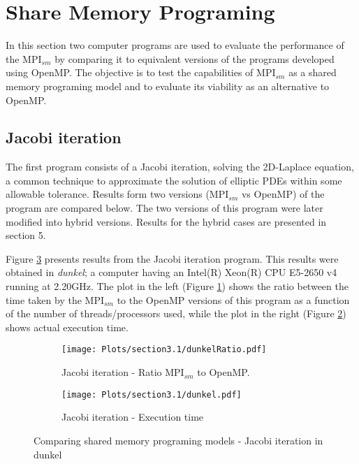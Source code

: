 \section{Share Memory Programing}

In this section two computer programs are used to evaluate the performance of the MPI$_{sm}$ by comparing it to equivalent versions of the programs developed using OpenMP. The objective is to test the capabilities of MPI$_{sm}$ as a shared memory programing model and to evaluate its viability as an alternative to OpenMP.


\subsection*{Jacobi iteration}
The first program consists of a Jacobi iteration, solving the 2D-Laplace equation, a common technique to approximate the solution of elliptic PDEs within some allowable tolerance. Results form two versions (MPI$_{sm}$ vs OpenMP) of the program are compared below. The two versions of this program were later modified into hybrid versions. Results for the hybrid cases are presented in section 5.

Figure \ref{fig:Figure1} presents results from the Jacobi iteration program. This results were obtained in \emph{dunkel}; a computer having an Intel(R) Xeon(R) CPU E5-2650 v4 running at 2.20GHz. The plot in the left (Figure \ref{fig:RatioDunkel}) shows the ratio between the time taken by the MPI$_{sm}$ to the OpenMP versions of this program as a function of the number of threads/processors used, while the plot in the right (Figure \ref{fig:TimeDunkel}) shows actual execution time.


\begin{figure} [h!]
    \centering
    \captionsetup{justification=raggedright, singlelinecheck=false}
    \begin{subfigure}{.6\textwidth}
      \hspace*{-1.5cm} 
      \texttt{[image: Plots/section3.1/dunkelRatio.pdf]}
      \caption[]{Jacobi iteration - Ratio MPI$_{sm}$ to OpenMP.}
      \label{fig:RatioDunkel}
    \end{subfigure}%
    \begin{subfigure}{.6\textwidth}
      \hspace*{-1.5cm} 
      \texttt{[image: Plots/section3.1/dunkel.pdf]}
      \caption{Jacobi iteration - Execution time}
      \label{fig:TimeDunkel}
    \end{subfigure}
\caption{Comparing shared memory programing models - Jacobi iteration in dunkel}
\label{fig:Figure1}
\end{figure}

